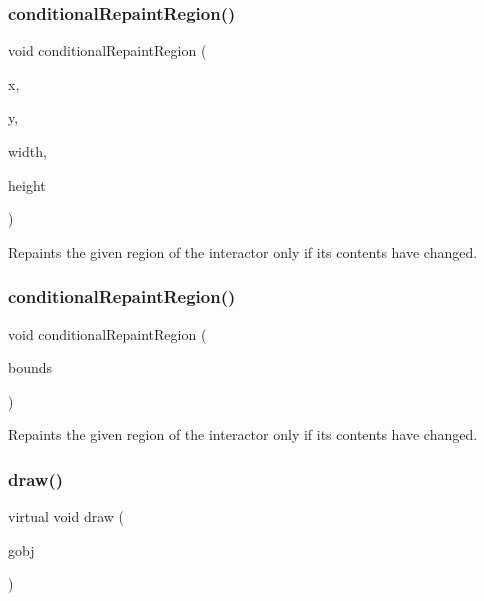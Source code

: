 \subsubsection{\texorpdfstring{conditional\+Repaint\+Region()}{conditionalRepaintRegion()}\hspace{0.1cm}{\footnotesize\ttfamily [1/2]}}
{\footnotesize\ttfamily void conditional\+Repaint\+Region (\begin{DoxyParamCaption}\item[{int}]{x,  }\item[{int}]{y,  }\item[{int}]{width,  }\item[{int}]{height }\end{DoxyParamCaption})\hspace{0.3cm}{\ttfamily [virtual]}}



Repaints the given region of the interactor only if its contents have changed. 

\mbox{\label{classGDrawingSurface_a3932a12278752db368e24fa404e446aa}} 
\subsubsection{\texorpdfstring{conditional\+Repaint\+Region()}{conditionalRepaintRegion()}\hspace{0.1cm}{\footnotesize\ttfamily [2/2]}}
{\footnotesize\ttfamily void conditional\+Repaint\+Region (\begin{DoxyParamCaption}\item[{const \mbox{\hyperlink{classGRectangle}{G\+Rectangle}} \&}]{bounds }\end{DoxyParamCaption})\hspace{0.3cm}{\ttfamily [virtual]}}



Repaints the given region of the interactor only if its contents have changed. 

\mbox{\label{classGDrawingSurface_ae65b7cc9bdfbc1bd01bec80ba83aab47}} 
\subsubsection{\texorpdfstring{draw()}{draw()}\hspace{0.1cm}{\footnotesize\ttfamily [1/4]}}
{\footnotesize\ttfamily virtual void draw (\begin{DoxyParamCaption}\item[{\mbox{\hyperlink{classGObject}{G\+Object}} $\ast$}]{gobj }\end{DoxyParamCaption})\hspace{0.3cm}{\ttfamily [pure virtual]}}



